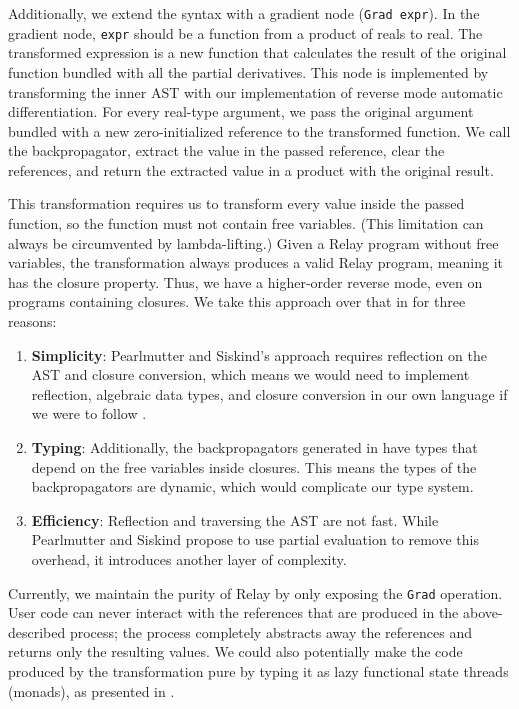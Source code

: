 Additionally, we extend the syntax with a gradient node (\texttt{Grad expr}). In the gradient node, \texttt{expr}
should be a function from a product of reals to real. The transformed expression is a new function
that calculates the result of the original function bundled with all the partial derivatives.
This node is implemented by transforming the inner AST with our implementation of reverse mode automatic differentiation.
For every real-type argument, we pass the original argument bundled with a new zero-initialized reference to the transformed function.
We call the backpropagator, extract the value in the passed reference, clear the references,
and return the extracted value in a product with the original result.

This transformation requires us to transform every value inside the passed function, so the function
must not contain free variables. (This limitation can always be circumvented by lambda-lifting.)
Given a Relay program without free variables, the transformation always produces a valid Relay
program, meaning it has the closure property. Thus, we have a higher-order reverse mode,
even on programs containing closures.
We take this approach over that in \cite{toplas_reverse} for three reasons:
\vspace{-3pt}
\begin{enumerate}
  \item \textbf{Simplicity}: Pearlmutter and Siskind's approach requires
    reflection on the AST and closure conversion, which means we would need to
    implement reflection, algebraic data types, and closure conversion in our
    own language if we were to follow \cite{toplas_reverse}.
  \item \textbf{Typing}: Additionally, the backpropagators generated in
    \cite{toplas_reverse} have types that depend on the free variables inside
    closures. This means the types of the backpropagators are dynamic, which
    would complicate our type system.
  \item \textbf{Efficiency}: Reflection and traversing the AST are not
    fast. While Pearlmutter and Siskind propose to use partial evaluation to
    remove this overhead, it introduces another layer of complexity.
\end{enumerate}

Currently, we maintain the purity of Relay by only exposing the \texttt{Grad} operation.
User code can never interact with the references that are produced in the above-described process;
the process completely abstracts away the references and returns only the resulting values.
We could also potentially make the code produced by the transformation pure by typing it as lazy functional state
threads (monads), as presented in \cite{lazy_fn_st}.

